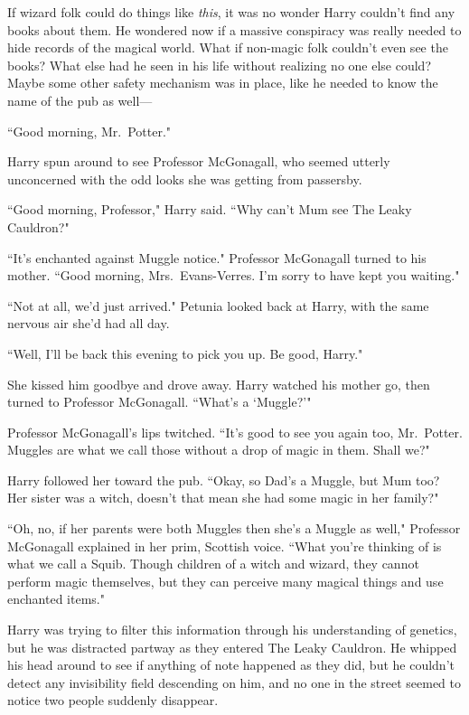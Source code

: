 If wizard folk could do things like \emph{this}, it was no wonder Harry couldn't find any books about them. He wondered now if a massive conspiracy was really needed to hide records of the magical world. What if non-magic folk couldn't even see the books? What else had he seen in his life without realizing no one else could? Maybe some other safety mechanism was in place, like he needed to know the name of the pub as well---

``Good morning, Mr.~Potter."

Harry spun around to see Professor McGonagall, who seemed utterly unconcerned with the odd looks she was getting from passersby.

``Good morning, Professor," Harry said. ``Why can't Mum see The Leaky Cauldron?"

``It's enchanted against Muggle notice." Professor McGonagall turned to his mother. ``Good morning, Mrs.~Evans-Verres. I'm sorry to have kept you waiting."

``Not at all, we'd just arrived." Petunia looked back at Harry, with the same nervous air she'd had all day.

``Well, I'll be back this evening to pick you up. Be good, Harry."

She kissed him goodbye and drove away. Harry watched his mother go, then turned to Professor McGonagall. ``What's a `Muggle?'"

Professor McGonagall's lips twitched. ``It's good to see you again too, Mr.~Potter. Muggles are what we call those without a drop of magic in them. Shall we?"

Harry followed her toward the pub. ``Okay, so Dad's a Muggle, but Mum too? Her sister was a witch, doesn't that mean she had some magic in her family?"

``Oh, no, if her parents were both Muggles then she's a Muggle as well," Professor McGonagall explained in her prim, Scottish voice. ``What you're thinking of is what we call a Squib. Though children of a witch and wizard, they cannot perform magic themselves, but they can perceive many magical things and use enchanted items."

Harry was trying to filter this information through his understanding of genetics, but he was distracted partway as they entered The Leaky Cauldron. He whipped his head around to see if anything of note happened as they did, but he couldn't detect any invisibility field descending on him, and no one in the street seemed to notice two people suddenly disappear.

